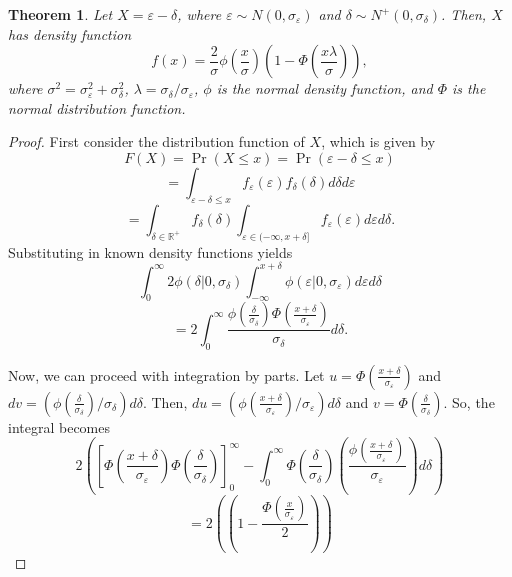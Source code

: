 \documentclass{article}
\newtheorem{theorem}{Theorem}
\newcommand{\ep}{\varepsilon}
\newcommand{\RR}{\mathbb{R}}
\begin{document}
	
\begin{theorem}
	Let $X = \ep - \delta$, where $\ep\sim N(0, \sigma_\ep)$ and $\delta\sim N^+(0, \sigma_\delta)$. Then, $X$ has density function
	$$f(x) = \frac{2}{\sigma}\phi\left(\frac{x}{\sigma}\right)\left(1 - \Phi\left(\frac{x\lambda}{\sigma}\right)\right),$$
	where $\sigma^2 = \sigma_\ep^2 + \sigma_\delta^2$, $\lambda = \sigma_\delta / \sigma_\ep$, $\phi$ is the normal density function, and $\Phi$ is the normal distribution function.
\end{theorem}
\begin{proof}
	First consider the distribution function of $X$, which is given by
	$$F(X) = \Pr(X \leq x) = \Pr(\ep - \delta \leq x)$$
	$$= \int_{\ep - \delta \leq x} f_\ep(\ep) f_\delta(\delta) d\delta d\ep$$
	$$= \int_{\delta\in\RR^+} f_\delta(\delta) \int_{\ep\in (-\infty, x + \delta]} f_\ep(\ep) d\ep d\delta.$$
	Substituting in known density functions yields
	$$\int_0^\infty 2\phi(\delta | 0, \sigma_\delta) \int_{-\infty}^{x + \delta} \phi(\ep | 0, \sigma_\ep) d\ep d\delta$$
	$$= 2\int_0^\infty \frac{\phi\left(\frac{\delta}{\sigma_\delta}\right) \Phi\left(\frac{x + \delta}{\sigma_\ep}\right)}{\sigma_\delta} d\delta.$$
	
	Now, we can proceed with integration by parts. Let $u = \Phi\left(\frac{x + \delta}{\sigma_\ep}\right)$ and $dv = \left(\phi\left(\frac{\delta}{\sigma_\delta}\right) / \sigma_\delta\right) d\delta$. Then, $du = \left(\phi\left(\frac{x + \delta}{\sigma_\ep}\right) / \sigma_\ep\right) d\delta$ and $v = \Phi\left(\frac{\delta}{\sigma_\delta}\right)$. So, the integral becomes
	$$2\left(\left[\Phi\left(\frac{x + \delta}{\sigma_\ep}\right) \Phi\left(\frac{\delta}{\sigma_\delta}\right)\right]_0^\infty - \int_0^\infty \Phi\left(\frac{\delta}{\sigma_\delta}\right) \left(\frac{\phi\left(\frac{x + \delta}{\sigma_\ep}\right)}{\sigma_\ep}\right) d\delta\right)$$
	$$= 2\left(\left(1 - \frac{\Phi\left(\frac{x}{\sigma_\ep}\right)}{2}\right)\right)$$
\end{proof}
\end{document}
